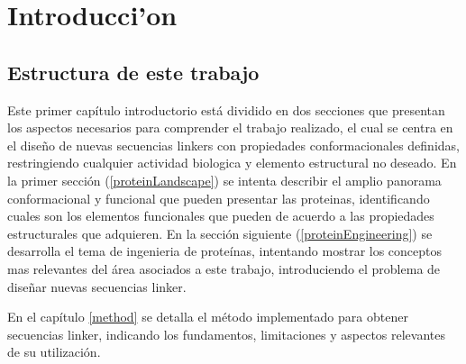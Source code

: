 \chapter{Introducci'on}
% 



\section{Estructura de este trabajo}

Este primer capítulo introductorio está dividido en dos secciones que presentan los aspectos necesarios para comprender el trabajo realizado, el cual se centra en el diseño de nuevas secuencias linkers con 
propiedades conformacionales definidas, restringiendo cualquier actividad biologica y elemento estructural no deseado.
En la primer sección (\ref{proteinLandscape}) se intenta describir el amplio panorama conformacional y funcional que pueden presentar las proteinas, 
identificando cuales son los elementos funcionales que pueden de acuerdo a las propiedades estructurales que adquieren.
En la sección siguiente (\ref{proteinEngineering}) se desarrolla el tema de ingenieria de proteínas, intentando mostrar los conceptos mas relevantes del área asociados a este trabajo, 
introduciendo el problema de diseñar nuevas secuencias linker.

En el capítulo \ref{method} se detalla el método implementado para obtener secuencias linker, indicando los fundamentos, limitaciones y aspectos relevantes de su utilización.

